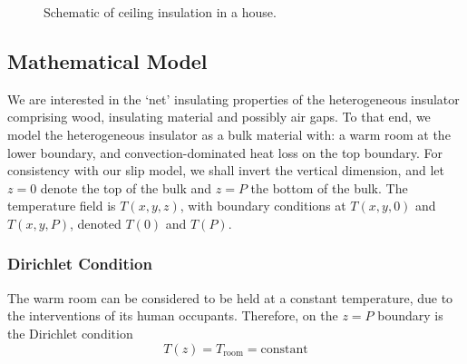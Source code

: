 \documentclass[12pt, a4paper, twoside, openright]{book}
\newcommand{\Tr}{\ensuremath{T_{\mathrm{room}}}}
\begin{document}
\begin{figure}[ht]
\centering
{}
\caption{Schematic of ceiling insulation in a house.}\label{house}
\end{figure}

\subsection{Mathematical Model}

We are interested in the `net' insulating properties of the heterogeneous insulator comprising wood, insulating material and possibly air gaps.  To that end, we model the heterogeneous insulator as a bulk material
with: a warm room at the lower boundary, and convection-dominated heat loss on the top boundary.  For consistency with our slip model, we shall invert the vertical dimension, and let $z=0$ denote the top of the bulk and $z=P$ the bottom of the bulk.  The temperature field is $T(x,y,z)$, with boundary conditions at $T(x,y,0)$ and $T(x,y,P)$, denoted $T(0)$ and $T(P)$.

\subsubsection{Dirichlet Condition}

The warm room can be considered to be held at a constant temperature, due to the interventions of its human occupants.  Therefore, on the $z=P$ boundary is the Dirichlet condition
\begin{equation}
T(z) = \Tr = \text{constant}
\end{equation}
\end{document}
